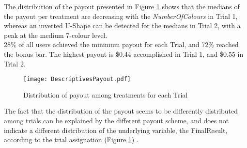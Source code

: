 The distribution of the payout presented in Figure \ref{Distributionofpayout} shows that the medians of the payout per treatment are decreasing with the \textit{NumberOfColours} in Trial 1, whereas an inverted U-Shape can be detected for the medians in Trial 2, with a peak at the medium 7-colour level.\\
28\% of all users achieved the minimum payout for each Trial, and 72\% reached the bonus bar. The highest payout is \$0.44 accomplished in Trial 1, and \$0.55 in Trial 2. 
 \begin{figure}[t] %
\begin{center} 
  \caption{Distribution of payout among treatments for each Trial}
  \label{Distributionofpayout}
  \texttt{[image: DescriptivesPayout.pdf]} 
\end{center}
\end{figure}

The fact that the distribution of the payout seems to be differently distributed among trials can be explained by the different payout scheme, and does not indicate a different distribution of the underlying variable, the FinalResult, according to the trial assignation (Figure \ref{Distributionofpayout}) .

